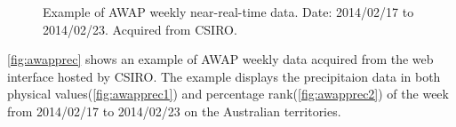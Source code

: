 \begin{figure}[hbt]
\myfloatalign
{} \quad
{}
\caption{Example of AWAP weekly near-real-time data. Date: 2014/02/17 to 2014/02/23. Acquired from CSIRO\citep{Awap2014}.}
\label{fig:awapprec}
\end{figure}
\newline
\autoref{fig:awapprec} shows an example of AWAP weekly data acquired from the web interface hosted by CSIRO. The example displays the precipitaion data in both physical values(\autoref{fig:awapprec1}) and percentage rank(\autoref{fig:awapprec2}) of the week from 2014/02/17 to 2014/02/23 on the Australian territories.
